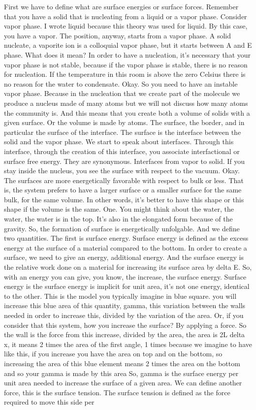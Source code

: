 First we have to define what are surface energies or surface forces. Remember that you have a solid that is nucleating from a liquid or a vapor phase. Consider vapor phase. I wrote liquid because this theory was used for liquid. By this case, you have a vapor. The position, anyway, starts from a vapor phase. A solid nucleate, a vaporite ion is a colloquial vapor phase, but it starts between A and E phase. What does it mean? In order to have a nucleation, it's necessary that your vapor phase is not stable, because if the vapor phase is stable, there is no reason for nucleation. If the temperature in this room is above the zero Celsius there is no reason for the water to condensate. Okay. So you need to have an instable vapor phase. Because in the nucleation that we create part of the molecule we produce a nucleus made of many atoms but we will not discuss how many atoms the community is. And this means that you create both a volume of solids with a given surface. Or the volume is made by atoms. The surface, the border, and in particular the surface of the interface. The surface is the interface between the solid and the vapor phase. We start to speak about interfaces. Through this interface, through the creation of this interface, you associate interfactional or surface free energy. They are synonymous. Interfaces from vapor to solid. If you stay inside the nucleus, you see the surface with respect to the vacuum. Okay. The surfaces are more energetically favorable with respect to bulk or less. That is, the system prefers to have a larger surface or a smaller surface for the same bulk, for the same volume. In other words, it's better to have this shape or this shape if the volume is the same. One. You might think about the water, the water, the water is in the top. It's also in the elongated form because of the gravity. So, the formation of surface is energetically unfolgable. And we define two quantities. The first is surface energy. Surface energy is defined as the excess energy at the surface of a material compared to the bottom. In order to create a surface, we need to give an energy, additional energy. And the surface energy is the relative work done on a material for increasing its surface area by delta E. So, with an energy you can give, you know, the increase, the surface energy. Surface energy is the surface energy is implicit for unit area, it's not one energy, identical to the other. This is the model you typically imagine in blue square. you will increase this blue area of this quantity, gamma, this variation between the walls needed in order to increase this, divided by the variation of the area. Or, if you consider that this system, how you increase the surface? By applying a force. So the wall is the force from this increase, divided by the area, the area is 2L delta x, it means 2 times the area of the first angle, 1 times because we imagine to have like this, if you increase you have the area on top and on the bottom, so increasing the area of this blue element means 2 times the area on the bottom and so your gamma is made by this area So, gamma is the surface energy per unit area needed to increase the surface of a given area. We can define another force, this is the surface tension. The surface tension is defined as the force required to move this side per 